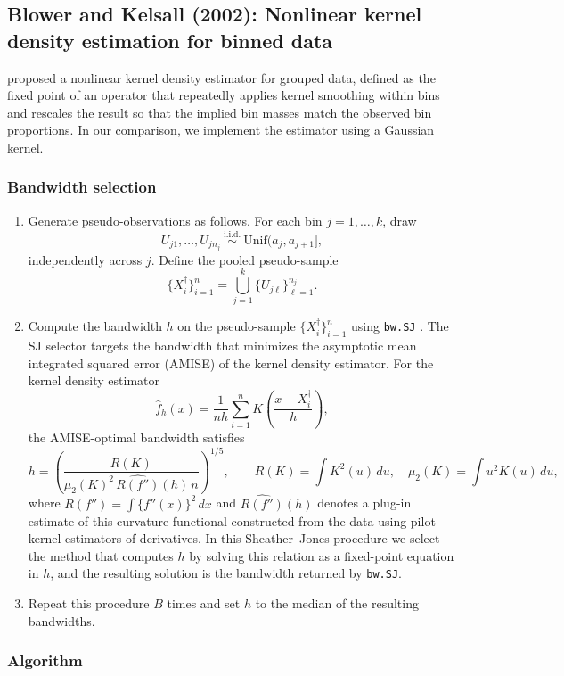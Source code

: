 \documentclass[12pt]{article} %
\begin{document}
\subsection{Blower and Kelsall (2002): Nonlinear kernel density estimation for binned data}

\cite{BlowerKelsall2002} proposed a nonlinear kernel density estimator for grouped data, defined as the fixed point of an operator that repeatedly applies kernel smoothing within bins and rescales the result so that the implied bin masses match the observed bin proportions. In our comparison, we implement the estimator using a Gaussian kernel.

\subsubsection*{Bandwidth selection}
\begin{enumerate}
\item Generate pseudo-observations as follows. For each bin $j=1,\ldots,k$, draw
\[
U_{j1},\ldots,U_{j n_j}\ \stackrel{\text{i.i.d.}}{\sim}\ \mathrm{Unif}(a_j,a_{j+1}],
\]
independently across $j$. Define the pooled pseudo-sample
\[
\{X_i^{\dagger}\}_{i=1}^{n}
=\bigcup_{j=1}^k \{U_{j\ell}\}_{\ell=1}^{n_j}.
\]
\item Compute the \cite{SheatherJones1991} bandwidth $h$ on the pseudo-sample $\{X_i^{\dagger}\}_{i=1}^n$ using \texttt{bw.SJ} \citep{RStatsBandwidth}. The SJ selector targets the bandwidth that minimizes the asymptotic mean integrated squared error (AMISE) of the kernel density estimator. For the kernel density estimator
\[
\hat f_h(x)=\frac{1}{nh}\sum_{i=1}^n K\!\left(\frac{x-X_i^{\dagger}}{h}\right),
\]
the AMISE-optimal bandwidth satisfies
\[
h=\left(\frac{R(K)}{\mu_2(K)^2\,\widehat{R(f'')}(h)\,n}\right)^{1/5},
\qquad 
R(K)=\int K^2(u)\,du,\quad 
\mu_2(K)=\int u^2K(u)\,du,
\]
where $R(f'')=\int\{f''(x)\}^2\,dx$ and $\widehat{R(f'')}(h)$ denotes a plug-in estimate of this curvature functional constructed from the data using pilot kernel estimators of derivatives. In this Sheather--Jones procedure we select the method that computes $h$ by solving this relation as a fixed-point equation in $h$, and the resulting solution is the bandwidth returned by \texttt{bw.SJ}.

\item Repeat this procedure $B$ times and set $h$ to the median of the resulting bandwidths.
\end{enumerate}

\subsubsection*{Algorithm}
\end{document}
